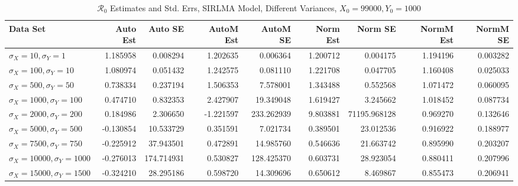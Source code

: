 \documentclass[12pt]{article}
\newcommand{\rr}{\ensuremath{\mathcal{R}_0}}
\begin{document}
\begin{table}[H]
	
	\caption{$\rr$ Estimates and Std. Errs, SIRLMA Model,
		Different Variances, 
		$X_0 = 99000, Y_0 = 1000$}
	\begin{footnotesize}
		\hskip -2cm
		\begin{tabular}{l|r|r|r|r|r|r|r|r}
			\hline
			Data Set & Auto Est & Auto SE & AutoM Est & AutoM SE & Norm Est & Norm SE & NormM Est & NormM SE\\
			\hline
			$\sigma_X = 10, \sigma_Y = 1$ & 1.185958 & 0.008294 & 1.202635 & 0.006364 & 1.200712 & 0.004175 & 1.194196 & 0.003282\\
			\hline
			$\sigma_X = 100, \sigma_Y = 10$ & 1.080974 & 0.051432 & 1.242575 & 0.081110 & 1.221708 & 0.047705 & 1.160408 & 0.025033\\
			\hline
			$\sigma_X = 500, \sigma_Y = 50$ & 0.738334 & 0.237194 & 1.506353 & 7.578001 & 1.343488 & 0.552568 & 1.071472 & 0.060095\\
			\hline
			$\sigma_X = 1000, \sigma_Y = 100$ & 0.474710 & 0.832353 & 2.427907 & 19.349048 & 1.619427 & 3.245662 & 1.018452 & 0.087734\\
			\hline
			$\sigma_X = 2000, \sigma_Y = 200$ & 0.184986 & 2.306650 & -1.221597 & 233.262939 & 9.803881 & 71195.968128 & 0.969270 & 0.132646\\
			\hline
			$\sigma_X = 5000, \sigma_Y = 500$ & -0.130854 & 10.533729 & 0.351591 & 7.021734 & 0.389501 & 23.012536 & 0.916922 & 0.188977\\
			\hline
			$\sigma_X = 7500, \sigma_Y = 750$ & -0.225912 & 37.943501 & 0.472891 & 14.985760 & 0.546636 & 21.663742 & 0.895990 & 0.203207\\
			\hline
			$\sigma_X = 10000, \sigma_Y = 1000$ & -0.276013 & 174.714931 & 0.530827 & 128.425370 & 0.603731 & 28.923054 & 0.880411 & 0.207996\\
			\hline
			$\sigma_X = 15000, \sigma_Y = 1500$ & -0.324210 & 28.295186 & 0.598720 & 14.309696 & 0.650612 & 8.469867 & 0.855473 & 0.206941\\
			\hline
		\end{tabular}
	\end{footnotesize}
\end{table}
\end{document}
